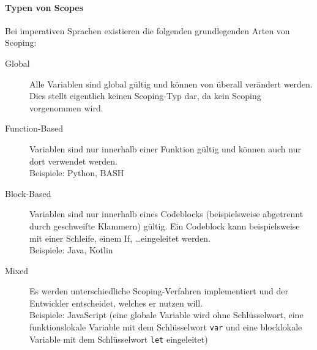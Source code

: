\paragraph{Typen von Scopes}
	Bei imperativen Sprachen existieren die folgenden grundlegenden Arten von Scoping:
	\begin{description}
		\item[Global] Alle Variablen sind global gültig und können von überall verändert werden. \\ Dies stellt eigentlich keinen Scoping-Typ dar, da kein Scoping vorgenommen wird.
		\item[Function-Based] Variablen sind nur innerhalb einer Funktion gültig und können auch nur dort verwendet werden. \\ Beispiele: Python, BASH
		\item[Block-Based] Variablen sind nur innerhalb eines Codeblocks (beispielsweise abgetrennt durch geschweifte Klammern) gültig. Ein Codeblock kann beispielsweise mit einer Schleife, einem If, \dots eingeleitet werden. \\ Beispiele: Java, Kotlin
		\item[Mixed] Es werden unterschiedliche Scoping-Verfahren implementiert und der Entwickler entscheidet, welches er nutzen will. \\ Beispiele: JavaScript (eine globale Variable wird ohne Schlüsselwort, eine funktionslokale Variable mit dem Schlüsselwort \texttt{var} und eine blocklokale Variable mit dem Schlüsselwort \texttt{let} eingeleitet)
	\end{description}
